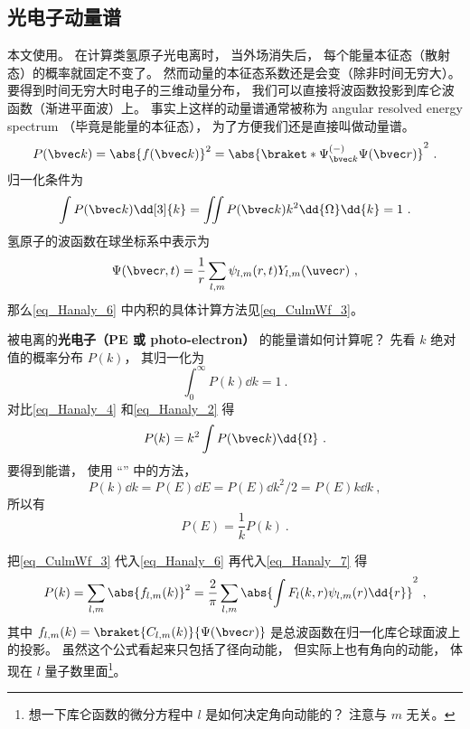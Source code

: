 

\subsection{光电子动量谱}

本文使用。 在计算类氢原子光电离时， 当外场消失后， 每个能量本征态（散射态）的概率就固定不变了。 然而动量的本征态系数还是会变（除非时间无穷大）。 要得到时间无穷大时电子的三维动量分布， 我们可以直接将波函数投影到库仑波函数（渐进平面波）上。 事实上这样的动量谱通常被称为 angular resolved energy spectrum （毕竟是能量的本征态）， 为了方便我们还是直接叫做动量谱。
\begin{equation}\label{eq_Hanaly_6}
P(\bvec k) = \abs{f(\bvec k)}^2 = \abs{\braket*{\Psi^{(-)}_{\bvec k}}{\Psi(\bvec r)}}^2~.
\end{equation}
归一化条件为
\begin{equation}\label{eq_Hanaly_4}
\int P(\bvec k) \dd[3]{k} = \iint P(\bvec k) k^2\dd{\Omega}\dd{k} = 1~.
\end{equation}
氢原子的波函数在球坐标系中表示为
\begin{equation}
\Psi(\bvec r, t) = \frac{1}{r}\sum_{l,m} \psi_{l,m}(r, t) Y_{l,m}(\uvec r)~,
\end{equation}
那么\autoref{eq_Hanaly_6} 中内积的具体计算方法见\autoref{eq_CulmWf_3}。

被电离的\textbf{光电子（PE 或 photo-electron）} 的能量谱如何计算呢？ 先看 $k$ 绝对值的概率分布 $P(k)$， 其归一化为
\begin{equation}\label{eq_Hanaly_2}
\int_0^\infty P(k) \dd{k} = 1~.
\end{equation}
对比\autoref{eq_Hanaly_4} 和\autoref{eq_Hanaly_2} 得
\begin{equation}\label{eq_Hanaly_7}
P(k) = k^2 \int P(\bvec k) \dd{\Omega}~.
\end{equation}
要得到能谱， 使用 “” 中的方法，
\begin{equation}\label{eq_Hanaly_1}
P(k)\dd{k} = P(E)\dd{E} = P(E)\dd{k^2/2} = P(E)k\dd{k}~,
\end{equation}
所以有
\begin{equation}
P(E) = \frac{1}{k}P(k)~.
\end{equation}

把\autoref{eq_CulmWf_3}  代入\autoref{eq_Hanaly_6} 再代入\autoref{eq_Hanaly_7} 得
\begin{equation}
P(k) = \sum_{l,m} \abs{f_{l,m}(k)}^2 = \frac{2}{\pi} \sum_{l,m} \abs{\int F_l(k, r) \psi_{l,m}(r) \dd{r}}^2~,
\end{equation}
其中 $f_{l,m}(k) = \braket{C_{l,m}(k)}{\Psi(\bvec r)}$ 是总波函数在归一化库仑球面波上的投影。 虽然这个公式看起来只包括了径向动能， 但实际上也有角向的动能， 体现在 $l$ 量子数里面\footnote{想一下库仑函数的微分方程中 $l$ 是如何决定角向动能的？ 注意与 $m$ 无关。}。

